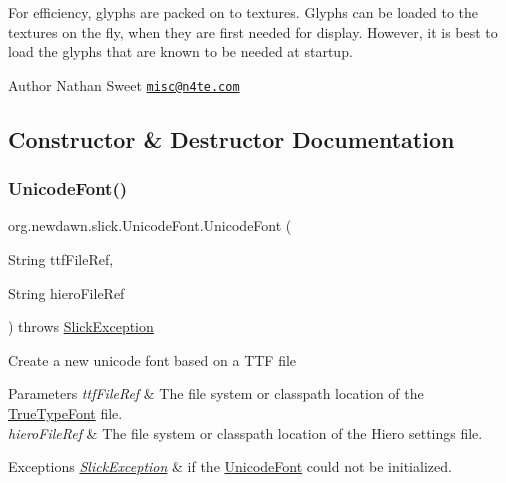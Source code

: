 For efficiency, glyphs are packed on to textures. Glyphs can be loaded to the textures on the fly, when they are first needed for display. However, it is best to load the glyphs that are known to be needed at startup. \begin{DoxyAuthor}{Author}
Nathan Sweet \href{mailto:misc@n4te.com}{\tt misc@n4te.\+com} 
\end{DoxyAuthor}


\subsection{Constructor \& Destructor Documentation}
\mbox{\label{classorg_1_1newdawn_1_1slick_1_1_unicode_font_acb84ea3da65e6ac55ce2283bc71e41cf}} 
\subsubsection{\texorpdfstring{Unicode\+Font()}{UnicodeFont()}\hspace{0.1cm}{\footnotesize\ttfamily [1/7]}}
{\footnotesize\ttfamily org.\+newdawn.\+slick.\+Unicode\+Font.\+Unicode\+Font (\begin{DoxyParamCaption}\item[{String}]{ttf\+File\+Ref,  }\item[{String}]{hiero\+File\+Ref }\end{DoxyParamCaption}) throws \mbox{\hyperlink{classorg_1_1newdawn_1_1slick_1_1_slick_exception}{Slick\+Exception}}\hspace{0.3cm}{\ttfamily [inline]}}

Create a new unicode font based on a T\+TF file


\begin{DoxyParams}{Parameters}
{\em ttf\+File\+Ref} & The file system or classpath location of the \mbox{\hyperlink{classorg_1_1newdawn_1_1slick_1_1_true_type_font}{True\+Type\+Font}} file. \\
\hline
{\em hiero\+File\+Ref} & The file system or classpath location of the Hiero settings file. \\
\hline
\end{DoxyParams}

\begin{DoxyExceptions}{Exceptions}
{\em \mbox{\hyperlink{classorg_1_1newdawn_1_1slick_1_1_slick_exception}{Slick\+Exception}}} & if the \mbox{\hyperlink{classorg_1_1newdawn_1_1slick_1_1_unicode_font}{Unicode\+Font}} could not be initialized. \\
\hline
\end{DoxyExceptions}

